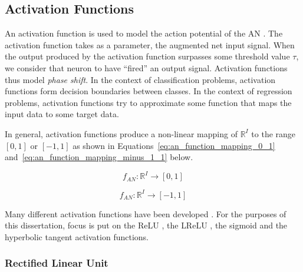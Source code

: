 \subsection{Activation Functions}\label{sec:anns:an:act_functions}

An activation function is used to model the action potential of the \acs{AN} \cite{ref:ziv:1994, ref:hodgkin:1952}. The activation function takes as a parameter, the augmented net input signal. When the output produced by the activation function surpasses some threshold value $\tau$, we consider that neuron to have ``fired'' an output signal. Activation functions thus model \textit{phase shift}. In the context of classification problems, activation functions form decision boundaries between classes. In the context of regression problems, activation functions try to approximate some function that maps the input data to some target data.

In general, activation functions produce a non-linear mapping of $\mathbb{R}^{I}$ to the range $[0,1]$ or $[-1,1]$ as shown in Equations~\eqref{eq:an_function_mapping_0_1} and~\eqref{eq:an_function_mapping_minus_1_1} below.

\begin{equation}
    f_{AN}: \mathbb{R}^{I} \rightarrow [0,1]
    \label{eq:an_function_mapping_0_1}
\end{equation}

\begin{equation}
    f_{AN}: \mathbb{R}^{I} \rightarrow [-1,1]
    \label{eq:an_function_mapping_minus_1_1}
\end{equation}

\noindent
Many different activation functions have been developed \cite{ref:karlik:2011}. For the purposes of this dissertation, focus is put on the \acf{ReLU} \cite{ref:jarrett:2009, ref:nair:2010}, the \acf{LReLU} \cite{ref:maas:2013}, the sigmoid \cite{ref:lecun:1988} and the hyperbolic tangent \cite{ref:lin:2008} activation functions.


\subsubsection{Rectified Linear Unit}\label{sec:anns:an:act_functions:relu}

